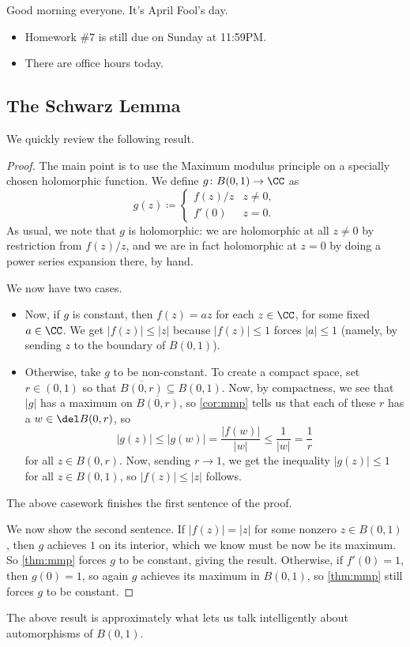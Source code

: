 \documentclass[../notes.tex]{subfiles}
\begin{document}

Good morning everyone. It's April Fool's day.
\begin{itemize}
	\item Homework \#7 is still due on Sunday at 11:59PM.
	\item There are office hours today.
\end{itemize}

\subsection{The Schwarz Lemma}
We quickly review the following result.
\schwarzlemma*
\begin{proof}
	The main point is to use the Maximum modulus principle on a specially chosen holomorphic function. We define $g\colon B(0,1)\to\CC$ as
	\[g(z)\coloneqq \begin{cases}
		f(z)/z & z\ne0, \\
		f'(0) & z=0.
	\end{cases}\]
	As usual, we note that $g$ is holomorphic: we are holomorphic at all $z\ne0$ by restriction from $f(z)/z$, and we are in fact holomorphic at $z=0$ by doing a power series expansion there, by hand.

	We now have two cases.
	\begin{itemize}
		\item Now, if $g$ is constant, then $f(z)=az$ for each $z\in\CC$, for some fixed $a\in\CC$. We get $|f(z)|\le|z|$ because $|f(z)|\le1$ forces $|a|\le1$ (namely, by sending $z$ to the boundary of $B(0,1)$).
		\item Otherwise, take $g$ to be non-constant. To create a compact space, set $r\in(0,1)$ so that $\overline{B(0,r)}\subseteq B(0,1)$. Now, by compactness, we see that $|g|$ has a maximum on $\overline{B(0,r)}$, so \autoref{cor:mmp} tells us that each of these $r$ has a $w\in\del B(0,r)$, so
		\[|g(z)|\le|g(w)|=\frac{|f(w)|}{|w|}\le\frac1{|w|}=\frac1r\]
		for all $z\in B(0,r)$. Now, sending $r\to 1$, we get the inequality $|g(z)|\le1$ for all $z\in B(0,1)$, so $|f(z)|\le|z|$ follows.
	\end{itemize}
	The above casework finishes the first sentence of the proof.

	We now show the second sentence. If $|f(z)|=|z|$ for some nonzero $z\in B(0,1)$, then $g$ achieves $1$ on its interior, which we know must be now be its maximum. So \autoref{thm:mmp} forces $g$ to be constant, giving the result. Otherwise, if $f'(0)=1$, then $g(0)=1$, so again $g$ achieves its maximum in $B(0,1)$, so \autoref{thm:mmp} still forces $g$ to be constant.
\end{proof}
\begin{remark}
	The above result is approximately what lets us talk intelligently about automorphisms of $B(0,1)$.
\end{remark}
\end{document}
